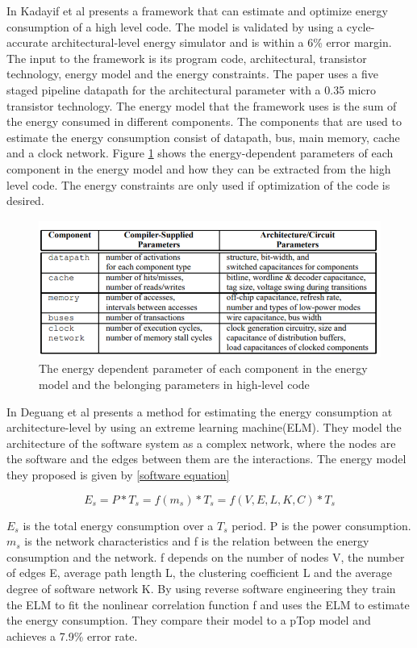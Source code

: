In \cite{EAC} Kadayif et al presents a framework that can estimate and optimize energy consumption of a high level code. The model is validated by using a cycle-accurate architectural-level energy simulator and is within a 6\% error margin. The input to the framework is its program code, architectural, transistor technology, energy model and the energy constraints. The paper uses a five staged pipeline datapath for the architectural parameter with a 0.35 micro transistor technology. The energy model that the framework uses is the sum of the energy consumed in different components. The components that are used to estimate the energy consumption consist of datapath, bus, main memory, cache and a clock network. Figure \ref{fig:EAC_table} shows the energy-dependent parameters of each component in the energy model and how they can be extracted from the high level code. The energy constraints are only used if optimization of the code is desired. 
\begin{figure}[H]
\centering
\includegraphics[height=4.5cm]{Project_Report/Images/EAC_table.PNG}
\caption{The energy dependent parameter of each component in the energy model and the belonging parameters in high-level code \cite{EAC}}
\label{fig:EAC_table}
\end{figure}
In \cite{Software_Energy} Deguang et al presents a method for estimating the energy consumption at architecture-level by using an extreme learning machine(ELM).  They model the architecture of the software system as a complex network, where the nodes are the software and the edges between them are the interactions. The energy model they proposed is given by \ref{software equation}

\begin{equation}
 E_{s}= P*T_{s} = f(m_{s})*T_{s}=f(V,E,L,K,C)*T_{s}
\label{software equation}
\end{equation}

$E_{s}$ is the total energy consumption over a $T_{s}$ period. P is the power consumption. $m_{s}$ is the network characteristics and f is the relation between the energy consumption and the network. f depends on the number of nodes V, the number of edges E, average path length L, the clustering coefficient L and the average degree of software network K. By using reverse software engineering they train the ELM to fit the nonlinear correlation function f and uses the ELM to estimate the energy consumption. They compare their model to a pTop model and achieves a 7.9\% error rate. 

